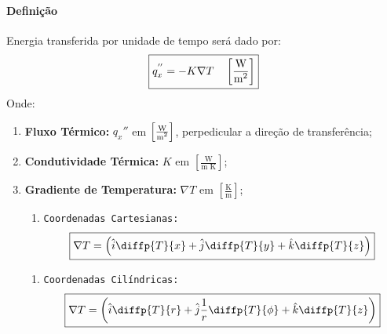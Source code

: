 \documentclass{article}
\begin{document}
            \paragraph{Definição}Energia transferida por unidade de tempo será dado por:
                \begin{equation}
                    \boxed{
                        q_{x}^{''} = - K \nabla T 
                        \quad 
                        \left[\frac{\text{W}}{\text{m\textsuperscript{2}}}\right]
                    }
                \end{equation}
            Onde:
                \begin{enumerate}[noitemsep, rightmargin = \leftmargin]
                    \item \textbf{Fluxo Térmico:} $q_{x}''$ em $\left[\frac{\text{W}}{\text{m\textsuperscript{2}}}\right]$, perpedicular a direção de transferência;

                    \item \textbf{Condutividade Térmica:} $K$ em $\left[\frac{\text{W}}{\text{m K}}\right]$;

                    \item \textbf{Gradiente de Temperatura:} $\nabla T$ em $\left[\frac{\text{K}}{\text{m}}\right]$;
                        \begin{enumerate}[noitemsep]
                            \item \texttt{Coordenadas Cartesianas:}
                                \begin{equation}
                                    \boxed{
                                        \nabla T = 
                                        \left(
                                            \hat{i}\diffp{T}{x} + 
                                            \hat{j}\diffp{T}{y} + 
                                            \hat{k}\diffp{T}{z}
                                        \right)
                                    }
                                \end{equation}
                        \end{enumerate}

                        \begin{enumerate}[noitemsep]
                            \item \texttt{Coordenadas Cilíndricas:}
                                \begin{equation}
                                    \boxed{
                                        \nabla T = 
                                        \left(
                                            \hat{i}\diffp{T}{r} + 
                                            \hat{j}\frac{1}{r}\diffp{T}{\phi} + 
                                            \hat{k}\diffp{T}{z}
                                        \right)
                                    }
                                \end{equation}
                        \end{enumerate}


\end{enumerate}
\end{document}
